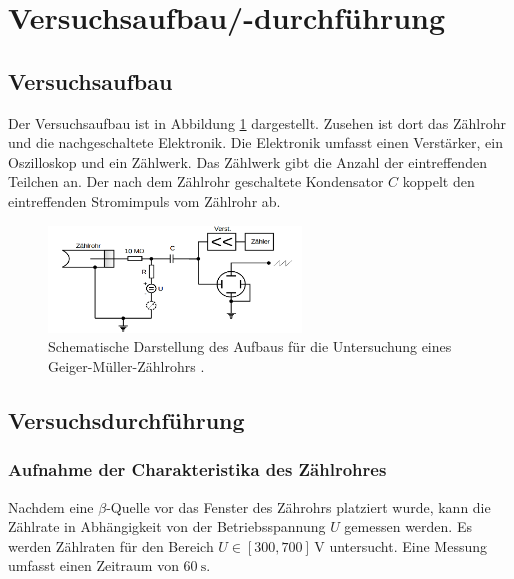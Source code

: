 \section{Versuchsaufbau/-durchführung}

\subsection{Versuchsaufbau}
Der Versuchsaufbau ist in Abbildung \ref{fig: versuchsaufabu} dargestellt.
Zusehen ist dort das Zählrohr und die nachgeschaltete Elektronik. %
Die Elektronik umfasst einen Verstärker, ein Oszilloskop und
ein Zählwerk. Das Zählwerk gibt die Anzahl der eintreffenden Teilchen
an. Der nach dem Zählrohr geschaltete Kondensator $C$ koppelt den eintreffenden
Stromimpuls vom Zählrohr ab.
\begin{figure}
  \centering
  \includegraphics[width=0.6\textwidth]{bilder/aufbau.png}
  \caption{Schematische Darstellung des Aufbaus für die Untersuchung eines Geiger-Müller-Zählrohrs \cite{anleitung703}.}
  \label{fig: versuchsaufabu}
  \end{figure}
\subsection{Versuchsdurchführung}

\subsubsection{Aufnahme der Charakteristika des Zählrohres} %

Nachdem eine $\beta$-Quelle vor das Fenster des Zährohrs platziert wurde,
kann die Zählrate in Abhängigkeit von der Betriebsspannung $U$ gemessen werden.
Es werden Zählraten für den Bereich $U\in\left[300, 700\right] \, \si{\volt}$
untersucht. Eine Messung umfasst einen Zeitraum von $\SI{60}{\second}$.


